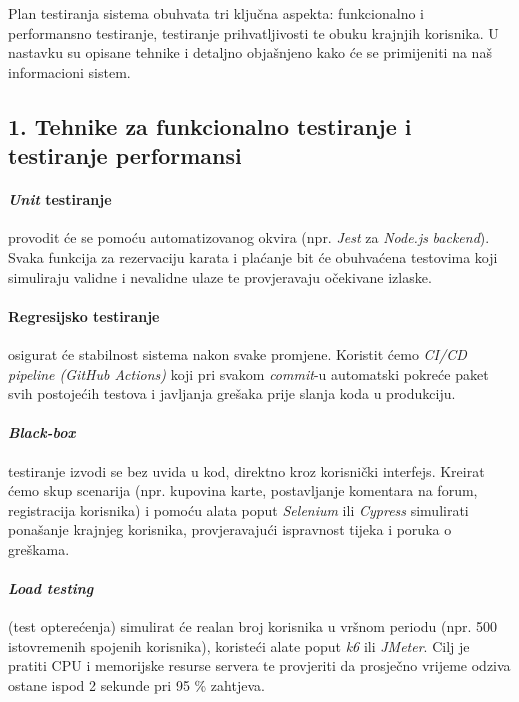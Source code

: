Plan testiranja sistema obuhvata tri ključna aspekta: funkcionalno i performansno testiranje, testiranje prihvatljivosti te obuku krajnjih korisnika. U nastavku su opisane tehnike i detaljno objašnjeno kako će se primijeniti na naš informacioni sistem.

\subsection*{1. Tehnike za funkcionalno testiranje i testiranje performansi}

\paragraph{\emph{Unit} testiranje} provodit će se pomoću automatizovanog okvira (npr. \emph{Jest} za \emph{Node.js} \emph{backend}). Svaka funkcija za rezervaciju karata i plaćanje bit će obuhvaćena testovima koji simuliraju validne i nevalidne ulaze te provjeravaju očekivane izlaske.

\paragraph{Regresijsko testiranje} osigurat će stabilnost sistema nakon svake promjene. Koristit ćemo \emph{CI/CD pipeline (GitHub Actions)} koji pri svakom \emph{commit}-u automatski pokreće paket svih postojećih testova i javljanja grešaka prije slanja koda u produkciju.

\paragraph{\emph{Black-box}} testiranje izvodi se bez uvida u kod, direktno kroz korisnički interfejs. Kreirat ćemo skup scenarija (npr. kupovina karte, postavljanje komentara na forum, registracija korisnika) i pomoću alata poput \emph{Selenium} ili \emph{Cypress} simulirati ponašanje krajnjeg korisnika, provjeravajući ispravnost tijeka i poruka o greškama.

\medskip

\paragraph{\emph{Load testing}} (test opterećenja) simulirat će realan broj korisnika u vršnom periodu (npr. 500 istovremenih spojenih korisnika), koristeći alate poput \emph{k6} ili \emph{JMeter}. Cilj je pratiti CPU i memorijske resurse servera te provjeriti da prosječno vrijeme odziva ostane ispod 2 sekunde pri 95 \% zahtjeva.

